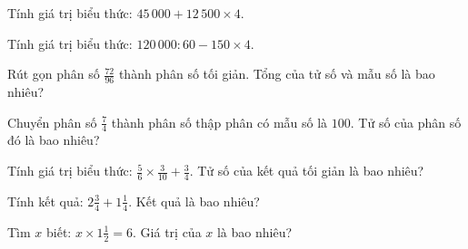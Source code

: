 
\begin{ex}
  Tính giá trị biểu thức: $45\,000 + 12\,500 \times 4$.
\end{ex}

\begin{ex}
  Tính giá trị biểu thức: $120\,000 : 60 - 150 \times 4$.
\end{ex}

\begin{ex}
  Rút gọn phân số $\frac{72}{96}$ thành phân số tối giản. Tổng của tử số và mẫu số là bao nhiêu?
\end{ex}

\begin{ex}
  Chuyển phân số $\frac{7}{4}$ thành phân số thập phân có mẫu số là $100$. Tử số của phân số đó là bao nhiêu?
\end{ex}

\begin{ex}
  Tính giá trị biểu thức: $\frac{5}{6} \times \frac{3}{10} + \frac{3}{4}$. Tử số của kết quả tối giản là bao nhiêu?
\end{ex}

\begin{ex}
  Tính kết quả: $2\frac{3}{4} + 1\frac{1}{4}$. Kết quả là bao nhiêu?
\end{ex}

\begin{ex}
  Tìm $x$ biết: $x \times 1\frac{1}{2} = 6$. Giá trị của $x$ là bao nhiêu?
\end{ex}

